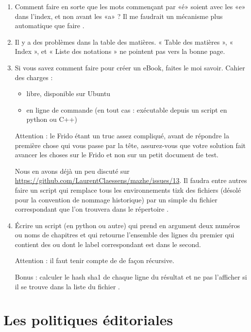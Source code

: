 \begin{enumerate}
    \item
        Comment faire en sorte que les mots commençant par «é» soient avec les «e» dans l'index, et non avant les «a» ? Il me faudrait un mécanisme plus automatique que faire .
    \item 
        Il y a des problèmes dans la table des matières.  « Table des matières », « Index », et « Liste des notations » ne pointent pas vers la bonne page.
    \item
        Si vous savez comment faire  pour créer un eBook, faites le moi savoir. Cahier des charges :
        \begin{itemize}
            \item libre, disponible sur Ubuntu
            \item en ligne de commande (en tout cas : exécutable depuis un script en python ou C++)
        \end{itemize}
        Attention : le Frido étant un truc assez compliqué, avant de répondre la première chose qui vous passe par la tête, assurez-vous que votre solution fait avancer les choses sur le Frido et non sur un petit document de test.

        Nous en avons déjà un peu discuté sur \url{https://github.com/LaurentClaessens/mazhe/issues/13}. Il faudra entre autres faire un script qui remplace tous les environnements tizk des fichiers  (désolé pour la convention de nommage historique) par un simple  du fichier  correspondant que l'on trouvera dans le répertoire .
    \item
        Écrire un script (en python ou autre) qui prend en argument deux numéros ou noms de chapitres et qui retourne l'ensemble des lignes du premier qui contient des  ou  dont le label correspondant est dans le second.

        Attention : il faut tenir compte de  de façon récursive.

        Bonus : calculer le hash sha1 de chaque ligne du résultat et ne pas l'afficher si il se trouve dans la liste du fichier .
\end{enumerate}

\section{Les politiques éditoriales}


